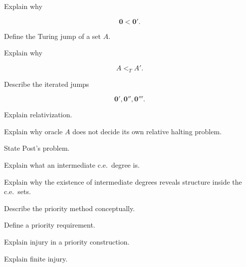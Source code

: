 \begin{exercise}[3]
Explain why

\[
\mathbf{0}
<
\mathbf{0}'.
\]
\end{exercise}

\begin{exercise}[3]
Define the Turing jump of a set \(A\).
\end{exercise}

\begin{exercise}[3]
Explain why

\[
A<_TA'.
\]
\end{exercise}

\begin{exercise}[3]
Describe the iterated jumps

\[
\mathbf{0}',
\mathbf{0}'',
\mathbf{0}'''.
\]
\end{exercise}

\begin{exercise}[3]
Explain relativization.
\end{exercise}

\begin{exercise}[3]
Explain why oracle \(A\) does not decide its own relative halting problem.
\end{exercise}

\begin{exercise}[2]
State Post's problem.
\end{exercise}

\begin{exercise}[3]
Explain what an intermediate c.e.\ degree is.
\end{exercise}

\begin{exercise}[3]
Explain why the existence of intermediate degrees reveals structure inside
the c.e.\ sets.
\end{exercise}

\begin{exercise}[2]
Describe the priority method conceptually.
\end{exercise}

\begin{exercise}[3]
Define a priority requirement.
\end{exercise}

\begin{exercise}[3]
Explain injury in a priority construction.
\end{exercise}

\begin{exercise}[3]
Explain finite injury.
\end{exercise}

